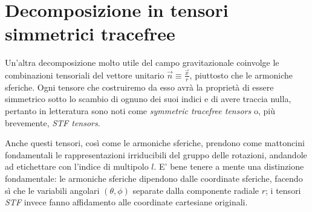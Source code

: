 \section{Decomposizione in tensori simmetrici tracefree}

Un'altra decomposizione molto utile del campo gravitazionale coinvolge le combinazioni tensoriali del vettore unitario $\vec{n} \equiv \frac{\vec{x}}{r}$, piuttosto che le armoniche sferiche. Ogni tensore che costruiremo da esso avrà la proprietà di essere simmetrico sotto lo scambio di ognuno dei suoi indici e di avere traccia nulla, pertanto in letteratura sono noti come \emph{symmetric tracefree tensors} o, più brevemente, \emph{STF tensors}.

Anche questi tensori, così come le armoniche sferiche, prendono come mattoncini fondamentali le rappresentazioni irriducibili del gruppo delle rotazioni, andandole ad etichettare con l'indice di multipolo $l$. E' bene tenere a mente una distinzione fondamentale: le armoniche sferiche dipendono dalle coordinate sferiche, facendo sì che le variabili angolari $(\theta, \phi)$ separate dalla componente radiale $r$; i tensori \emph{STF} invece fanno affidamento alle coordinate cartesiane originali.

